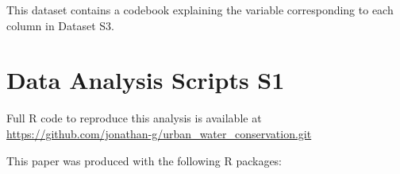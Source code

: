 \documentclass[draft]{agujournal}\usepackage{knitr}
\begin{document}
This dataset contains a codebook explaining the variable corresponding to each column in Dataset S3.

\section*{Data Analysis Scripts S1}

Full R code to reproduce this analysis is available at \url{https://github.com/jonathan-g/urban_water_conservation.git}


This paper was produced with the following R packages:
\end{document}
